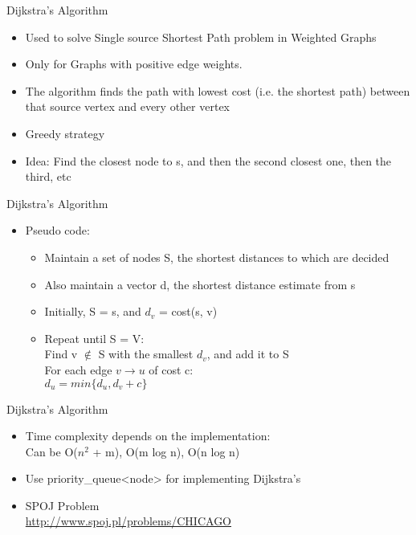 \documentclass{beamer}
\begin{document}
\begin{frame}[<+->]{Dijkstra's Algorithm}
\begin{block}{}
  \begin{itemize}
    \item Used to solve Single source Shortest Path problem in Weighted Graphs
    \item Only for Graphs with positive edge weights.
    \item The algorithm finds the path with lowest cost (i.e. the shortest path) between that source vertex and every other vertex
    \item Greedy strategy
    \item Idea: Find the closest node to s, and then the second closest one, then the third, etc
  \end{itemize}
\end{block}
\end{frame}

\begin{frame}[<+->]{Dijkstra's Algorithm}
\begin{block}{}
  \begin{itemize}
    \item Pseudo code:\\
    \begin{itemize}
      \item Maintain a set of nodes S, the shortest distances to which are decided
      \item Also maintain a vector d, the shortest distance estimate from s
      \item Initially, S = s, and $d_v$ = cost(s, v)
      \item Repeat until S = V:\\
	\hspace{3mm} Find v $\notin$ S with the smallest $d_v$, and add it to S\\
	\hspace{3mm} For each edge $v \rightarrow u$ of cost c:\\
	  \hspace{8mm} $d_u = min\{d_u, d_v + c\}$
    \end{itemize}
  \end{itemize}
\end{block}
\end{frame}

\begin{frame}[<+->]{Dijkstra's Algorithm}
\begin{block}{}
  \begin{itemize}
    \item Time complexity depends on the implementation:\\
      \hspace{3mm} Can be O($n^2$ + m), O(m log n), O(n log n)
    \item Use priority\_queue<node> for implementing Dijkstra's
    \item SPOJ Problem\\
    \url{http://www.spoj.pl/problems/CHICAGO}
  \end{itemize}
\end{block}
\end{frame}
\end{document}
